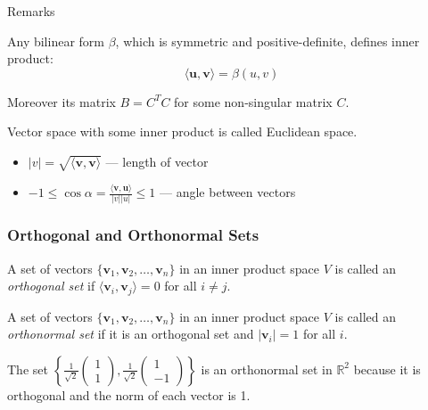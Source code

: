 \documentclass[fullscreen=true, bookmarks=true, hyperref={pdfencoding=unicode}]{beamer}
\begin{document}
\begin{frame}{Remarks}
  \begin{block}{}
    Any bilinear form $\beta$, which is symmetric and positive-definite, defines inner product:
    $$ \langle \mathbf{u}, \mathbf{v} \rangle = \beta(u, v)$$

    Moreover its matrix $B = C^TC$ for some non-singular matrix $C$.
  \end{block}
  
  \pause\vspace{1cm}
  Vector space with some inner product is called Euclidean space.
  \begin{itemize}
    \item $|v| = \sqrt{\langle \mathbf{v}, \mathbf{v} \rangle}$ — 
    length of vector
    \item $-1 \le \cos \alpha = \frac{\langle \mathbf{v}, \mathbf{u} \rangle}{|v||u|} \le 1$ — 
    angle between vectors 
  \end{itemize}
\end{frame}


\begin{frame}
  \frametitle{Orthogonal and Orthonormal Sets}
  
  \pause
  \begin{definition}
  A set of vectors $\{\mathbf{v}_1, \mathbf{v}_2, \dots, \mathbf{v}_n\}$ in an inner product space $V$ is called an \textit{orthogonal set} if $\langle \mathbf{v}_i, \mathbf{v}_j \rangle = 0$ for all $i \neq j$.
  \end{definition}
  
  \pause
  \begin{definition}
  A set of vectors $\{\mathbf{v}_1, \mathbf{v}_2, \dots, \mathbf{v}_n\}$ in 
  an inner product space $V$ is called an \textit{orthonormal set} if 
  it is an orthogonal set and $|\mathbf{v}_i| = 1$ for all $i$.
  \end{definition}
    
  \pause
  \begin{example}
  The set $\left\{ \frac{1}{\sqrt{2}} \begin{pmatrix} 1 \\ 1 \end{pmatrix}, \frac{1}{\sqrt{2}} \begin{pmatrix} 1 \\ -1 \end{pmatrix} \right\}$ is an orthonormal set in $\mathbb{R}^2$ because it is orthogonal and the norm of each vector is 1.
  \end{example}  
\end{frame}
\end{document}
